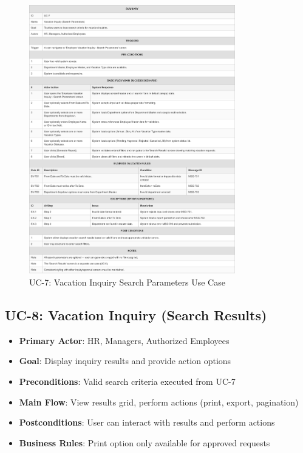 \documentclass[12pt,a4paper]{article}
\begin{document}
\begin{figure}[H]
\centering
\includegraphics[width=0.8\textwidth]{Use-Cases/UC-7-Vacation-Inquiry-Search-Parameters/UC-7-Vacation-Inquiry-Search-Parameters-1.png}
\caption{UC-7: Vacation Inquiry Search Parameters Use Case}
\label{fig:uc7}
\end{figure}

\subsection{UC-8: Vacation Inquiry (Search Results)}
\begin{itemize}
    \item \textbf{Primary Actor}: HR, Managers, Authorized Employees
    \item \textbf{Goal}: Display inquiry results and provide action options
    \item \textbf{Preconditions}: Valid search criteria executed from UC-7
    \item \textbf{Main Flow}: View results grid, perform actions (print, export, pagination)
    \item \textbf{Postconditions}: User can interact with results and perform actions
    \item \textbf{Business Rules}: Print option only available for approved requests
\end{itemize}
\end{document}
